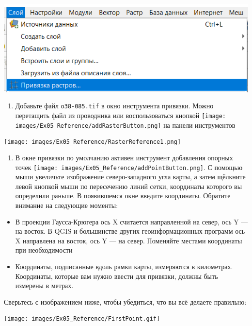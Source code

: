 \documentclass[
  12pt,
]{book}
\providecommand{\tightlist}{%
  \setlength{\itemsep}{0pt}\setlength{\parskip}{0pt}}
\begin{document}
\includegraphics{images/Ex05_Reference/RasterReference0.png}

\begin{enumerate}
\def\labelenumi{\arabic{enumi}.}
\setcounter{enumi}{5}
\tightlist
\item
  Добавьте файл \texttt{o38-085.tif} в окно инструмента привязки. Можно перетащить файл из проводника или воспользоваться кнопкой \texttt{[image: images/Ex05\_Reference/addRasterButton.png]} на панели инструментов
\end{enumerate}

\texttt{[image: images/Ex05\_Reference/RasterReference1.png]}

\begin{enumerate}
\def\labelenumi{\arabic{enumi}.}
\setcounter{enumi}{6}
\tightlist
\item
  В окне привязки по умолчанию активен инструмент добавления опорных точек \texttt{[image: images/Ex05\_Reference/addPointButton.png]}. С помощью мыши увеличьте изображение северо-западного угла карты, а затем щёлкните левой кнопкой мыши по пересечению линий сетки, координаты которого вы определили раньше. В появившемся окне введите координаты. Обратите внимание на следующие моменты:
\end{enumerate}

\begin{itemize}
\tightlist
\item
  В проекции Гаусса-Крюгера ось X считается направленной на север, ось Y --- на восток. В QGIS и большинстве других геоинформационных программ ось X направлена на восток, ось Y --- на север. Поменяйте местами координаты при необходимости
\item
  Координаты, подписанные вдоль рамки карты, измеряются в километрах. Координаты, которые вам нужно ввести для привязки, должны быть измерены в метрах.
\end{itemize}

Сверьтесь с изображением ниже, чтобы убедиться, что вы всё делаете правильно:

\texttt{[image: images/Ex05\_Reference/FirstPoint.gif]}
\end{document}
